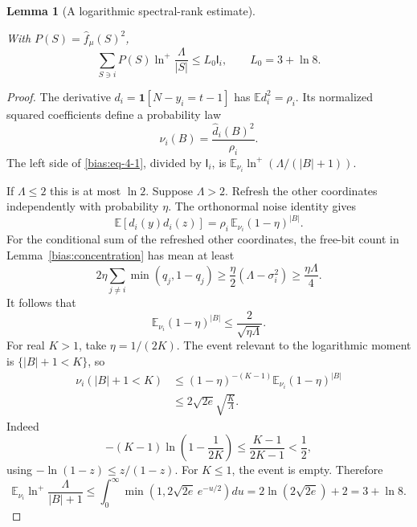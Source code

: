\documentclass[11pt]{amsart}
\newtheorem{lemma}[theorem]{Lemma}
\theoremstyle{definition}
\theoremstyle{remark}
\newcommand{\I}{\mathsf I}
\begin{document}
\begin{lemma}[A logarithmic spectral-rank estimate]\label{bias:rank}

With \(P(S)=\widehat f_\mu(S)^2\), \begin{equation}\label{bias:eq-4-1}
\sum_{S\ni i}P(S)\ln^+\frac{\Lambda}{|S|}
       \le L_0 \I_i,\qquad
 L_0=3+\ln8.
\end{equation}

\end{lemma}
\begin{proof}

The derivative \(d_i=\mathbf1[N-y_i=t-1]\) has \(\mathbb Ed_i^2=\rho_i\). Its normalized squared coefficients define a probability law \[
 \nu_i(B)=\frac{\widehat d_i(B)^2}{\rho_i}.
\] The left side of \eqref{bias:eq-4-1}, divided by \(\I_i\), is \(\mathbb E_{\nu_i}\ln^+(\Lambda/(|B|+1))\).

If \(\Lambda\le2\) this is at most \(\ln2\). Suppose \(\Lambda>2\). Refresh the other coordinates independently with probability \(\eta\). The orthonormal noise identity gives \[
 \mathbb E[d_i(y)d_i(z)]
 =\rho_i\,\mathbb E_{\nu_i}(1-\eta)^{|B|}.
\] For the conditional sum of the refreshed other coordinates, the free-bit count in Lemma~\ref{bias:concentration} has mean at least \[
 2\eta\sum_{j\ne i}\min(q_j,1-q_j)
 \ge \frac\eta2(\Lambda-\sigma_i^2)
 \ge\frac{\eta\Lambda}{4}.
\] It follows that \[
 \mathbb E_{\nu_i}(1-\eta)^{|B|}
 \le\frac2{\sqrt{\eta\Lambda}}.
\] For real \(K>1\), take \(\eta=1/(2K)\). The event relevant to the logarithmic moment is \(\{|B|+1<K\}\), so \[
 \begin{aligned}
 \nu_i(|B|+1<K)
 &\le(1-\eta)^{-(K-1)}
          \mathbb E_{\nu_i}(1-\eta)^{|B|}\\
 &\le2\sqrt{2e}\sqrt{\frac K\Lambda}.
 \end{aligned}
\] Indeed \[
 -(K-1)\ln\left(1-\frac1{2K}\right)
 \le\frac{K-1}{2K-1}<\frac12,
\] using \(-\ln(1-z)\le z/(1-z)\). For \(K\le1\), the event is empty. Therefore \[
 \mathbb E_{\nu_i}\ln^+\frac{\Lambda}{|B|+1}
 \le\int_0^\infty
       \min\left(1,2\sqrt{2e}\,e^{-u/2}\right)du
 =2\ln(2\sqrt{2e})+2=3+\ln8.
\]

\end{proof}
\end{document}
